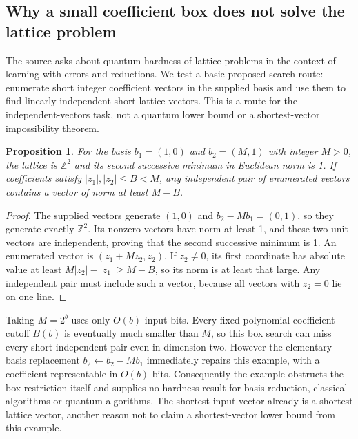 \documentclass[11pt]{article}
\newtheorem{proposition}{Proposition}
\begin{document}
\subsection{Why a small coefficient box does not solve the lattice problem}
The source asks about quantum hardness of lattice problems in the context of learning with errors and reductions. We test a basic proposed search route: enumerate short integer coefficient vectors in the supplied basis and use them to find linearly independent short lattice vectors. This is a route for the independent-vectors task, not a quantum lower bound or a shortest-vector impossibility theorem.
\begin{proposition}
For the basis $b_1=(1,0)$ and $b_2=(M,1)$ with integer $M>0$, the lattice is $\mathbb Z^2$ and its second successive minimum in Euclidean norm is 1. If coefficients satisfy $|z_1|,|z_2|\le B<M$, any independent pair of enumerated vectors contains a vector of norm at least $M-B$.
\end{proposition}
\begin{proof}
The supplied vectors generate $(1,0)$ and $b_2-Mb_1=(0,1)$, so they generate exactly $\mathbb Z^2$. Its nonzero vectors have norm at least 1, and these two unit vectors are independent, proving that the second successive minimum is 1. An enumerated vector is $(z_1+Mz_2,z_2)$. If $z_2\ne0$, its first coordinate has absolute value at least $M|z_2|-|z_1|\ge M-B$, so its norm is at least that large. Any independent pair must include such a vector, because all vectors with $z_2=0$ lie on one line.
\end{proof}
Taking $M=2^b$ uses only $O(b)$ input bits. Every fixed polynomial coefficient cutoff $B(b)$ is eventually much smaller than $M$, so this box search can miss every short independent pair even in dimension two. However the elementary basis replacement $b_2\leftarrow b_2-Mb_1$ immediately repairs this example, with a coefficient representable in $O(b)$ bits. Consequently the example obstructs the box restriction itself and supplies no hardness result for basis reduction, classical algorithms or quantum algorithms. The shortest input vector already is a shortest lattice vector, another reason not to claim a shortest-vector lower bound from this example.
\end{document}
